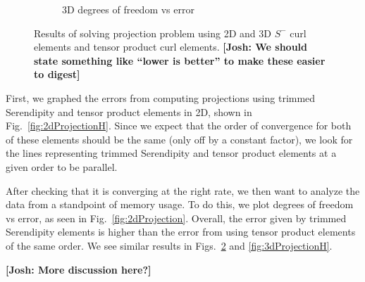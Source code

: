 \documentclass[manuscript,screen]{acmart}
\newcommand\josh[1]{\textbf{\textcolor[rgb]{0,.5,1}{[Josh: #1]}}}
\begin{document}
\begin{figure}[h!]
\begin{subfigure}[h]{0.5\textwidth}
    \caption{3D degrees of freedom vs error}
    \label{fig:3dProjectionDofs}
  \end{subfigure}
  \caption{Results of solving projection problem using 2D and 3D $S^-$ curl elements and tensor product curl elements.  \josh{We should state something like ``lower is better'' to make these easier to digest}} 
\end{figure}
  
First, we graphed the errors from computing projections using trimmed Serendipity and tensor product elements in 2D, shown in Fig.~\ref{fig:2dProjectionH}.  Since we expect that the order of convergence for both of these elements should be the same (only off by a constant factor), we look for the lines representing trimmed Serendipity and tensor product elements at a given order to be parallel.
  
After checking that it is converging at the right rate, we then want to analyze the data from a standpoint of memory usage.  To do this, we plot degrees of freedom vs error, as seen in Fig.~\ref{fig:2dProjection}.  Overall, the error given by trimmed Serendipity elements is higher than the error from using tensor product elements of the same order.   We see similar results in Figs.~\ref{fig:3dProjectionDofs} and \ref{fig:3dProjectionH}.
  
\josh{More discussion here?}


\newpage
 
\end{document}
